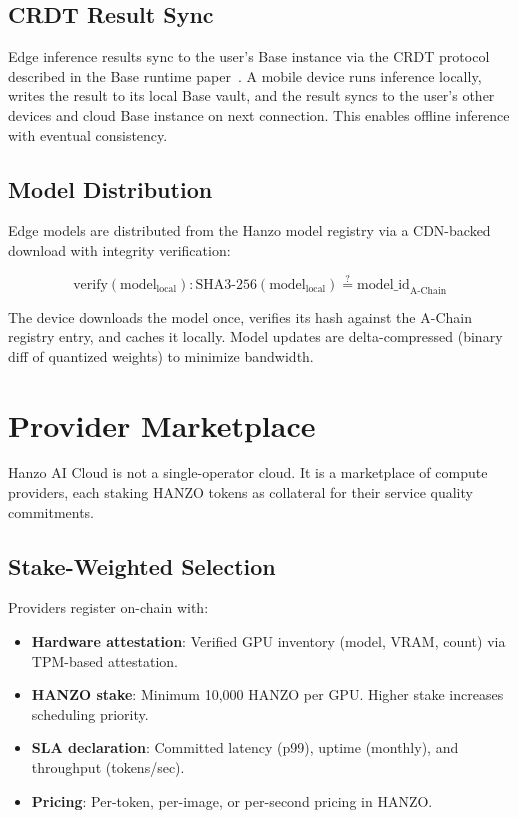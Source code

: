 \documentclass[11pt]{article}
\begin{document}
\subsection{CRDT Result Sync}

Edge inference results sync to the user's Base instance via the CRDT protocol
described in the Base runtime paper~\cite{hanzobaseruntime}. A mobile device
runs inference locally, writes the result to its local Base vault, and the
result syncs to the user's other devices and cloud Base instance on next
connection. This enables offline inference with eventual consistency.

\subsection{Model Distribution}

Edge models are distributed from the Hanzo model registry via a CDN-backed
download with integrity verification:

\begin{equation}
\text{verify}(\text{model}_{\text{local}}) :
\text{SHA3-256}(\text{model}_{\text{local}}) \stackrel{?}{=}
\text{model\_id}_{\text{A-Chain}}
\end{equation}

The device downloads the model once, verifies its hash against the A-Chain
registry entry, and caches it locally. Model updates are delta-compressed
(binary diff of quantized weights) to minimize bandwidth.

\section{Provider Marketplace}
\label{sec:marketplace}

Hanzo AI Cloud is not a single-operator cloud. It is a marketplace of compute
providers, each staking HANZO tokens as collateral for their service quality
commitments.

\subsection{Stake-Weighted Selection}

Providers register on-chain with:

\begin{itemize}[leftmargin=1.1em]
    \item \textbf{Hardware attestation}: Verified GPU inventory (model, VRAM,
    count) via TPM-based attestation.
    \item \textbf{HANZO stake}: Minimum 10,000 HANZO per GPU. Higher stake
    increases scheduling priority.
    \item \textbf{SLA declaration}: Committed latency (p99), uptime (monthly),
    and throughput (tokens/sec).
    \item \textbf{Pricing}: Per-token, per-image, or per-second pricing in
    HANZO.
\end{itemize}
\end{document}
